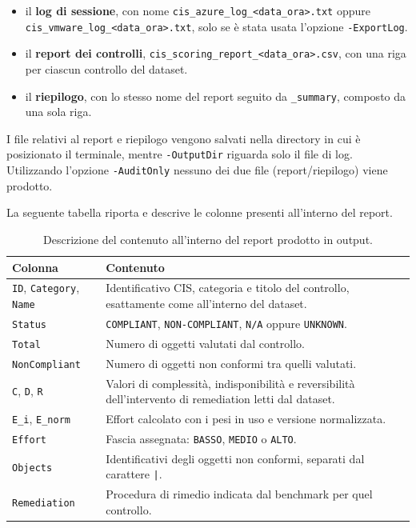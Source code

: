 \documentclass[a4paper,11pt]{report}
\begin{document}
\begin{itemize}
\item il \textbf{log di sessione}, con nome \texttt{cis\_azure\_log\_<data\_ora>.txt} oppure\\ \texttt{cis\_vmware\_log\_<data\_ora>.txt}, solo se è stata usata l'opzione \texttt{-ExportLog}.
\item il \textbf{report dei controlli}, \texttt{cis\_scoring\_report\_<data\_ora>.csv}, con una riga per ciascun controllo del dataset.
\item il \textbf{riepilogo}, con lo stesso nome del report seguito da \texttt{\_summary}, composto da una sola riga.
\end{itemize}

I file relativi al report e riepilogo vengono salvati nella directory in cui è posizionato il terminale, mentre \texttt{-OutputDir} riguarda solo il file di log. Utilizzando l'opzione \texttt{-AuditOnly} nessuno dei due file (report/riepilogo) viene prodotto.

La seguente tabella riporta e descrive le colonne presenti all'interno del report.

\begin{table}[H]
\centering
\small
\begin{tabular}{p{2.7cm}p{8.9cm}}
\hline
\textbf{Colonna} & \textbf{Contenuto} \\
\hline
\texttt{ID}, \texttt{Category}, \texttt{Name} & Identificativo CIS, categoria e titolo del controllo, esattamente come all'interno del dataset. \\ \hline
\texttt{Status} & \texttt{COMPLIANT}, \texttt{NON-COMPLIANT}, \texttt{N/A} oppure \texttt{UNKNOWN}. \\ \hline
\texttt{Total} & Numero di oggetti valutati dal controllo. \\ \hline
\texttt{NonCompliant} & Numero di oggetti non conformi tra quelli valutati. \\ \hline
\texttt{C}, \texttt{D}, \texttt{R} & Valori di complessità, indisponibilità e reversibilità dell'intervento di remediation letti dal dataset. \\ \hline
\texttt{E\_i}, \texttt{E\_norm} & Effort calcolato con i pesi in uso e versione normalizzata. \\ \hline
\texttt{Effort} & Fascia assegnata: \texttt{BASSO}, \texttt{MEDIO} o \texttt{ALTO}. \\ \hline
\texttt{Objects} & Identificativi degli oggetti non conformi, separati dal carattere \texttt{|}. \\ \hline
\texttt{Remediation} & Procedura di rimedio indicata dal benchmark per quel controllo. \\ 
\hline
\end{tabular}
\caption{Descrizione del contenuto all'interno del report prodotto in output.}
\label{tab:colonne}
\end{table}
\end{document}
